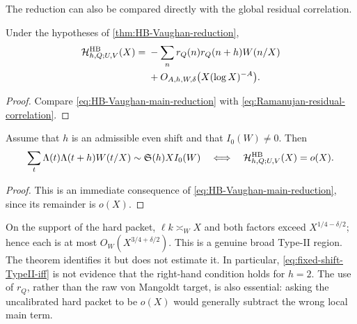 The reduction can also be compared directly with the global residual
correlation.

\begin{corollary}
\label{cor:hard-versus-residual-correlation}
Under the hypotheses of \cref{thm:HB-Vaughan-reduction},
\begin{align}
 \mathcal H^{\rm HB}_{h,Q;U,V}(X)
 ={}&-\sum_nr_Q(n)r_Q(n+h)W(n/X)
 \notag\\
 &+O_{A,h,W,\delta}\bigl(X(\log X)^{-A}\bigr).
 \label{eq:hard-residual-autocorrelation-equivalence}
\end{align}
\end{corollary}

\begin{proof}
Compare \eqref{eq:HB-Vaughan-main-reduction} with
\eqref{eq:Ramanujan-residual-correlation}.
\end{proof}

\begin{corollary}
\label{cor:fixed-shift-TypeII-gate}
Assume that $h$ is an admissible even shift and that $I_0(W)\ne0$.  Then
\begin{equation}
 \sum_t\Lambda(t)\Lambda(t+h)W(t/X)
 \sim\mathfrak S(h)XI_0(W)
 \quad\Longleftrightarrow\quad
 \mathcal H^{\rm HB}_{h,Q;U,V}(X)=o(X).
 \label{eq:fixed-shift-TypeII-iff}
\end{equation}
\end{corollary}

\begin{proof}
This is an immediate consequence of
\eqref{eq:HB-Vaughan-main-reduction}, since its remainder is $o(X)$.
\end{proof}

On the support of the hard packet, $\ell k\asymp_WX$ and both factors
exceed $X^{1/4-\delta/2}$; hence each is at most
$O_W(X^{3/4+\delta/2})$.  This is a genuine broad Type-II region.  The
theorem identifies it but does not estimate it.  In particular,
\eqref{eq:fixed-shift-TypeII-iff} is not evidence that the right-hand
condition holds for $h=2$.  The use of $r_Q$, rather than the raw
von Mangoldt target, is also essential: asking the uncalibrated hard
packet to be $o(X)$ would generally subtract the wrong local main term.
